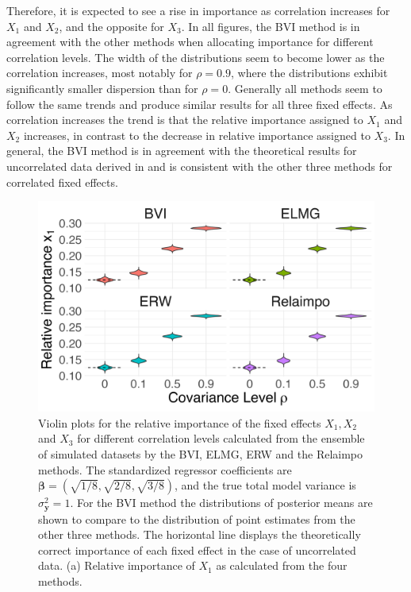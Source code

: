Therefore, it is expected to see a rise in importance as correlation increases for $X_1$ and $X_2$, and the opposite for $X_3$.
In all figures, the BVI method is in agreement with the other methods when allocating importance for different correlation levels.
The width of the distributions seem to become lower as the correlation increases, most notably for $\rho=0.9$, where the distributions exhibit significantly smaller dispersion than for $\rho=0$.
Generally all methods seem to follow the same trends and produce similar results for all three fixed effects. 
As correlation increases the trend is that the relative importance assigned to $X_1$ and $X_2$ increases, in contrast to the decrease in relative importance assigned to $X_3$.
\newline
\newline
In general, the BVI method is in agreement with the theoretical results for uncorrelated data derived in  and is consistent with the other three methods for correlated fixed effects. 
\begin{figure}[H]
  \centering
    \includegraphics[width=0.7\linewidth]{Figures/ViolinPlots/Variance_V1.png}
    \caption{Violin plots for the relative importance of the fixed effects $X_1, X_2$ and $X_3$ for different correlation levels calculated from the ensemble of simulated datasets by the BVI, ELMG, ERW and the Relaimpo methods. The standardized regressor coefficients are $\boldsymbol{\beta}=\left(\sqrt{1/8}, \sqrt{2/8}, \sqrt{3/8}\right)$, and the true total model variance is $\sigma^2_{\mathbf{y}}=1$. For the BVI method the distributions of posterior means are shown to compare to the distribution of point estimates from the other three methods. The horizontal line displays the theoretically correct importance of each fixed effect in the case of uncorrelated data. (a) Relative importance of $X_1$ as calculated from the four methods.}
    \label{fig:relimp_X1}
\end{figure}
